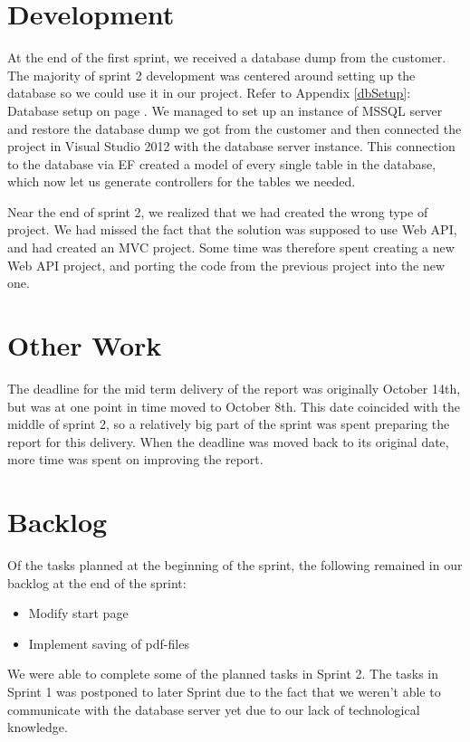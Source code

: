 \section{Development}
At the end of the first sprint, we received a database dump from the customer. The majority of sprint 2 development was centered around setting up the database so we could use it in our project. Refer to Appendix \ref{dbSetup}: Database setup on page \pageref{dbSetup}.
We managed to set up an instance of MSSQL server and restore the database dump we got from the customer and then connected the project in Visual Studio 2012 with the database server instance. This connection to the database via EF created a model of every single table in the database, which now let us generate controllers for the tables we needed.

Near the end of sprint 2, we realized that we had created the wrong type of project. We had missed the fact that the solution was supposed to use Web API, and had created an MVC project. Some time was therefore spent creating a new Web API project, and porting the code from the previous project into the new one.

\section{Other Work}
The deadline for the mid term delivery of the report was originally October 14th, but was at one point in time moved to October 8th. This date coincided with the middle of sprint 2, so a relatively big part of the sprint was spent preparing the report for this delivery. When the deadline was moved back to its original date, more time was spent on improving the report.

\section{Backlog}
Of the tasks planned at the beginning of the sprint, the following remained in our backlog at the end of the sprint:
\begin{itemize}
	\item Modify start page
	\item Implement saving of pdf-files
\end{itemize}
We were able to complete some of the planned tasks in Sprint 2. The tasks in Sprint 1 was postponed to later Sprint due to the fact that we weren't able to communicate with the database server yet due to our lack of technological knowledge.


